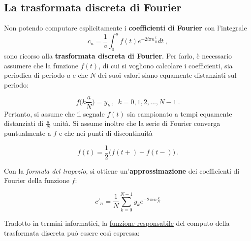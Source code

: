 \documentclass[
]{book}
\begin{document}
\hypertarget{dft}{%
\subsection{La trasformata discreta di Fourier}\label{dft}}

Non potendo computare esplicitamente i \textbf{coefficienti di Fourier} con l'integrale
\[ c_n=\frac{1}{a} \int_{0}^{a}f(t)e^{-2 i \pi n \textstyle \frac {t}{a}}dt \ , \]
sono ricorso alla \textbf{trasformata discreta di Fourier}.
Per farlo, è necessario assumere che la funzione \(f(t)\), di cui si vogliono calcolare i coefficienti, sia periodica di periodo \(a\) e che \(N\) dei suoi valori siano equamente distanziati sul periodo:

\[f \bigg( k\frac{a}{N} \bigg)=y_{k} \ , \ \ k=0,1,2,..., N-1 \ .\]
Pertanto, si assume che il segnale \(f(t)\) sia campionato a tempi equamente distanziati di \(\frac{a}{N}\) unità.
Si assume inoltre che la serie di Fourier converga puntualmente a \(f\) e che nei punti di discontinuità

\[f(t)=\frac{1}{2}\big(f(t+)+f(t-)\big) \ .\]

Con la \emph{formula del trapezio}, si ottiene un'\textbf{approssimazione} dei coefficienti di Fourier della funzione \(f\):

\begin{equation}
    c'_n=\frac{1}{N}\sum_{k=0}^{N-1}y_{k}e^{-2\pi in\frac{k}{N}}
    \label{eq:dcoeff}
\end{equation}

Tradotto in termini informatici, la \href{https://github.com/Bradwave/thesis/blob/master/animations/js/utils/fourier.js}{funzione responsabile} del computo della trasformata discreta può essere così espressa:
\end{document}
